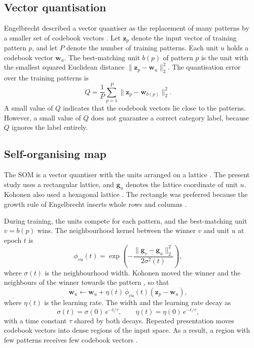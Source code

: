 \documentclass[conference,10pt]{IEEEtran}
\begin{document}
\subsection{Vector quantisation}
Engelbrecht described a vector quantiser as the replacement of many patterns by a smaller set of codebook vectors \cite{engelbrecht2007}.
Let $\mathbf{z}_p$ denote the input vector of training pattern $p$, and let $P$ denote the number of training patterns.
Each unit $u$ holds a codebook vector $\mathbf{w}_u$.
The best-matching unit $b(p)$ of pattern $p$ is the unit with the smallest squared Euclidean distance $\lVert\mathbf{z}_p-\mathbf{w}_u\rVert_2^2$.
The quantisation error over the training patterns is
\begin{equation}
Q=\frac{1}{P}\sum_{p=1}^{P}\lVert\mathbf{z}_p-\mathbf{w}_{b(p)}\rVert_2^2.
\label{eq:qe}
\end{equation}
A small value of $Q$ indicates that the codebook vectors lie close to the patterns.
However, a small value of $Q$ does not guarantee a correct category label, because $Q$ ignores the label entirely.

\subsection{Self-organising map}
The SOM is a vector quantiser with the units arranged on a lattice \cite{kohonen1990,kohonen2001}.
The present study uses a rectangular lattice, and $\mathbf{g}_u$ denotes the lattice coordinate of unit $u$.
Kohonen also used a hexagonal lattice \cite{kohonen1990}.
The rectangle was preferred because the growth rule of Engelbrecht inserts whole rows and columns \cite{engelbrecht2007}.

During training, the units compete for each pattern, and the best-matching unit $v=b(p)$ wins.
The neighbourhood kernel between the winner $v$ and unit $u$ at epoch $t$ is
\begin{equation}
\phi_{vu}(t)=\exp\left(-\frac{\lVert\mathbf{g}_v-\mathbf{g}_u\rVert_2^2}{2\sigma^2(t)}\right),
\label{eq:kernel}
\end{equation}
where $\sigma(t)$ is the neighbourhood width.
Kohonen moved the winner and the neighbours of the winner towards the pattern \cite{kohonen1990}, so that
\begin{equation}
\mathbf{w}_u\leftarrow\mathbf{w}_u+\eta(t)\,\phi_{vu}(t)\left(\mathbf{z}_p-\mathbf{w}_u\right),
\label{eq:update}
\end{equation}
where $\eta(t)$ is the learning rate.
The width and the learning rate decay as
\begin{equation}
\sigma(t)=\sigma(0)\,e^{-t/\tau},\qquad\eta(t)=\eta(0)\,e^{-t/\tau},
\label{eq:decay}
\end{equation}
with a time constant $\tau$ shared by both decays.
Repeated presentation moves codebook vectors into dense regions of the input space.
As a result, a region with few patterns receives few codebook vectors \cite{kohonen2001}.
\end{document}
